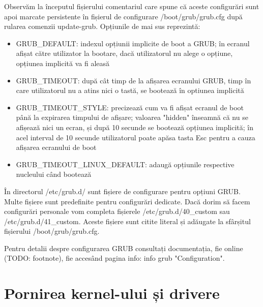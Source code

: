 
Observăm la începutul fișierului comentariul care spune că aceste configurări
sunt apoi marcate persistente în fișierul de configurare /boot/grub/grub.cfg
după rularea comenzii update-grub. Opțiunile de mai sus reprezintă:

\begin{itemize}
	\item GRUB_DEFAULT: indexul opțiunii implicite de boot a GRUB; în
		ecranul afișat către utilizator la bootare, dacă utilizatorul nu
		alege o opțiune, opțiunea implicită va fi aleasă
	\item GRUB_TIMEOUT: după cât timp de la afișarea ecranului GRUB, timp în
		care utilizatorul nu a atins nici o tastă, se bootează în
		optiunea implicită
	\item GRUB_TIMEOUT_STYLE: precizează cum va fi afișat ecranul de boot
		până la expirarea timpului de afișare; valoarea "hidden"
		înseamnă că nu se afișează nici un ecran, și după 10 secunde se
		bootează opțiunea implicită; în acel interval de 10 secunde
		utilizatorul poate apăsa tasta Esc pentru a cauza afișarea
		ecranului de boot
	\item GRUB_TIMEOUT_LINUX_DEFAULT: adaugă opțiunile respective nucleului
		când bootează
\end{itemize}

În directorul /etc/grub.d/ sunt fișiere de configurare pentru opțiuni GRUB.
Multe fișiere sunt predefinite pentru configurări dedicate. Dacă dorim să facem
configurări personale vom completa fișierele /etc/grub.d/40_custom sau
/etc/grub.d/41_custom. Aceste fișiere sunt citite literal și adăugate la
sfârșitul fișierului /boot/grub/grub.cfg.

Pentru detalii despre configurarea GRUB consultați documentația, fie online
(TODO: footnote), fie accesând pagina info: info grub "Configuration".

\section{Pornirea kernel-ului și drivere}
\label{sec:boot-bootupos}

